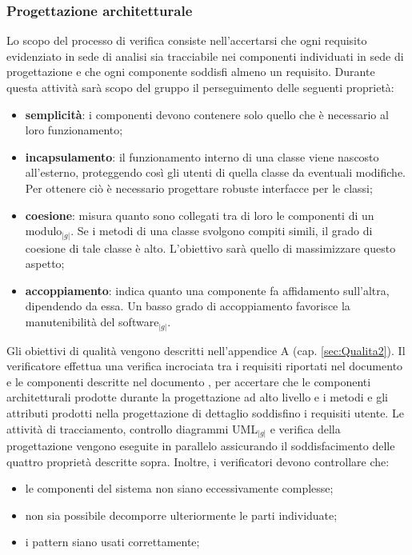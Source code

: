 {{{	}
	
	\subsubsection{Progettazione architetturale}{
		Lo scopo del processo di verifica consiste nell'accertarsi che ogni requisito evidenziato in sede di analisi sia tracciabile 
		nei componenti individuati in sede di progettazione e che ogni componente soddisfi almeno un requisito.
		Durante questa attività sarà scopo del gruppo il perseguimento delle seguenti proprietà:
		\begin{itemize}
		    \item \textbf{semplicità}: i componenti devono contenere solo quello che è necessario al loro funzionamento;
		    \item \textbf{incapsulamento}: il funzionamento interno di una classe viene nascosto all'esterno, proteggendo 
			  così gli utenti di quella classe da eventuali modifiche. Per ottenere ciò è necessario progettare robuste 
			  interfacce per le classi;
		    \item \textbf{coesione}: misura quanto sono collegati tra di loro le componenti di un modulo$_{|g|}$. Se i metodi 
			  di una classe svolgono compiti simili, il grado di coesione di tale classe è alto. 
			  L'obiettivo sarà quello di massimizzare questo aspetto;
		    \item \textbf{accoppiamento}: indica quanto una componente fa affidamento sull'altra, dipendendo da essa. 
			  Un basso grado di accoppiamento favorisce la manutenibilità del software$_{|g|}$.
		\end{itemize}
		Gli obiettivi di qualità vengono descritti nell'appendice A (cap. \ref{sec:Qualita2}).
		Il verificatore effettua una verifica incrociata tra i requisiti riportati nel documento \textit{\AnalisiDeiRequisiti} 
		e le componenti descritte nel documento \textit{\SpecificaTecnica}, per accertare che le componenti architetturali prodotte 
		durante la progettazione ad alto livello e i metodi e gli attributi prodotti nella progettazione di dettaglio soddisfino 
		i requisiti utente. Le attività di tracciamento, controllo diagrammi UML$_{|g|}$ e verifica della progettazione vengono 
		eseguite in parallelo assicurando il soddisfacimento delle quattro proprietà descritte sopra. 
		Inoltre, i verificatori devono controllare che:
		\begin{itemize}
			\item le componenti del sistema non siano eccessivamente complesse;
			\item non sia possibile decomporre ulteriormente le parti individuate;
			\item i pattern siano usati correttamente;
		\end{itemize}
	    
}}}
